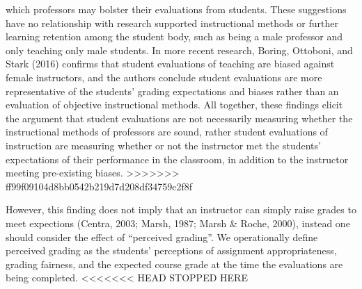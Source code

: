 \documentclass[,man]{apa6}
\newcounter{author}
\theoremstyle{definition}
\theoremstyle{definition}
\theoremstyle{definition}
\theoremstyle{remark}
\begin{document}
which professors may bolster their evaluations from students. These
suggestions have no relationship with research supported instructional
methods or further learning retention among the student body, such as
being a male professor and only teaching only male students. In more
recent research, Boring, Ottoboni, and Stark (2016) confirms that
student evaluations of teaching are biased against female instructors,
and the authors conclude student evaluations are more representative of
the students' grading expectations and biases rather than an evaluation
of objective instructional methods. All together, these findings elicit
the argument that student evaluations are not necessarily measuring
whether the instructional methods of professors are sound, rather
student evaluations of instruction are measuring whether or not the
instructor met the students' expectations of their performance in the
classroom, in addition to the instructor meeting pre-existing biases.
>>>>>>> ff99f09104d8bb0542b219d7d208df34759c2f8f

However, this finding does not imply that an instructor can simply raise
grades to meet expections (Centra, 2003; Marsh, 1987; Marsh \& Roche,
2000), instead one should consider the effect of \enquote{perceived
grading}. We operationally define perceived grading as the students'
perceptions of assignment appropriateness, grading fairness, and the
expected course grade at the time the evaluations are being completed.
<<<<<<< HEAD
STOPPED HERE
\end{document}
